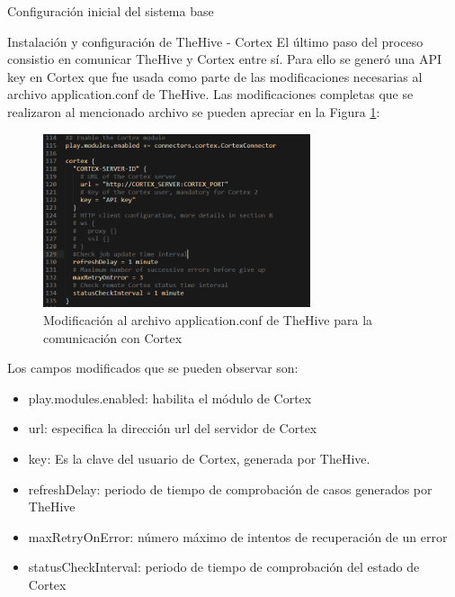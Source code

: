 \begin{section}{Configuración inicial del sistema base}
\begin{subsection}{Instalación y configuración de TheHive - Cortex}
        El último paso del proceso consistio en comunicar TheHive y Cortex entre sí. Para ello se generó una API key en Cortex que fue usada como parte de las modificaciones necesarias al archivo application.conf de TheHive. Las modificaciones completas que se realizaron al mencionado archivo se pueden apreciar en la Figura \ref{fig:figura_40_thehive_cortex_conf}:\par
        
        \begin{figure}[H]
            \centering
            \includegraphics[width=0.7\textwidth]{./iteracion_1_imagenes/figura_40_thehive_cortex_conf.png}
            \caption{Modificación al archivo application.conf de TheHive para la comunicación con Cortex}
            \label{fig:figura_40_thehive_cortex_conf}
        \end{figure}
        Los campos modificados que se pueden observar son:
        \begin{itemize}
            \item play.modules.enabled: habilita el módulo de Cortex
            \item url: especifica la dirección url del servidor de Cortex
            \item key: Es la clave del usuario de Cortex, generada por TheHive.
            \item refreshDelay: periodo de tiempo de comprobación de casos generados por TheHive
            \item maxRetryOnError: número máximo de intentos de recuperación de un error
            \item statusCheckInterval: periodo de tiempo de comprobación del estado de Cortex
        \end{itemize}
        
        \end{subsection}
    \end{section}
    
